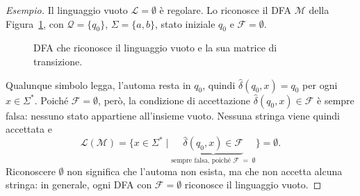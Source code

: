\documentclass[a4paper, 11pt, oneside]{book}
\theoremstyle{formale}
\newenvironment{esempio}
    {\begin{proof}[\textit{Esempio}]\renewcommand{\qedsymbol}{$\diamond$}}
    {\end{proof}}
\begin{document}
    \begin{esempio}
        Il linguaggio vuoto $\mathcal{L} = \emptyset$ \`e regolare. Lo riconosce il DFA
        $\mathcal{M}$ della Figura~\ref{fig:dfa-vuoto}, con $\mathcal{Q} = \{q_0\}$,
        $\Sigma = \{a, b\}$, stato iniziale $q_0$ e $\mathcal{F} = \emptyset$.

        \begin{figure}[H]
            \centering
            \caption{DFA che riconosce il linguaggio vuoto e la sua matrice di
                transizione.}
            \label{fig:dfa-vuoto}
        \end{figure}

        Qualunque simbolo legga, l'automa resta in $q_0$, quindi
        $\hat{\delta}(q_0, x) = q_0$ per ogni $x \in \Sigma^*$. Poich\'e
        $\mathcal{F} = \emptyset$, per\`o, la condizione di accettazione
        $\hat{\delta}(q_0, x) \in \mathcal{F}$ \`e sempre falsa: nessuno stato appartiene
        all'insieme vuoto. Nessuna stringa viene quindi accettata e
        \begin{equation*}
            \mathcal{L}(\mathcal{M})
            = \{x \in \Sigma^* \mid \underbrace{\hat{\delta}(q_0, x) \in \mathcal{F}}_{\text{
            sempre falsa, poich\'e } \mathcal{F} \;=\; \emptyset}\}
            = \emptyset.
        \end{equation*}
        Riconoscere $\emptyset$ non significa che l'automa non esista, ma che non accetta
        alcuna stringa: in generale, ogni DFA con $\mathcal{F} = \emptyset$ riconosce il
        linguaggio vuoto.
    \end{esempio}
\end{document}
